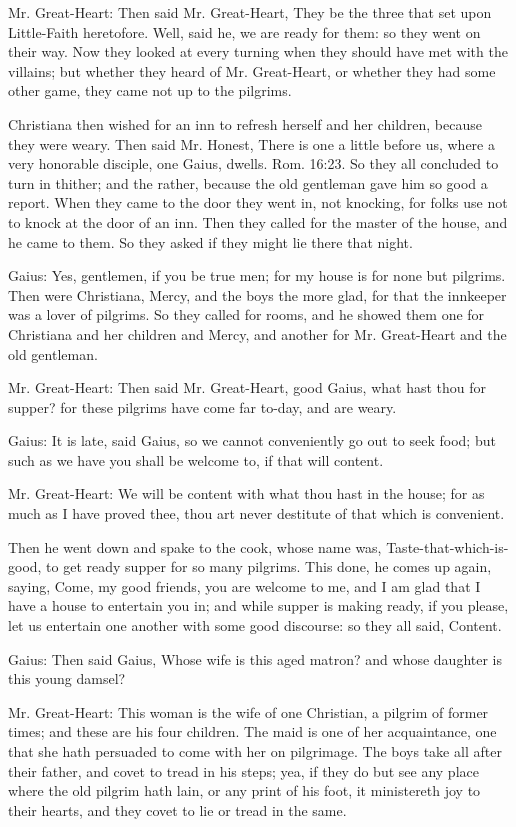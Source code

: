 Mr. Great-Heart: Then said Mr. Great-Heart, They be the three that set upon Little-Faith heretofore. Well, said he, we are ready for them: so they went on their way. Now they looked at every turning when they should have met with the villains; but whether they heard of Mr. Great-Heart, or whether they had some other game, they came not up to the pilgrims.

Christiana then wished for an inn to refresh herself and her children, because they were weary. Then said Mr. Honest, There is one a little before us, where a very honorable disciple, one Gaius, dwells. Rom. 16:23. So they all concluded to turn in thither; and the rather, because the old gentleman gave him so good a report. When they came to the door they went in, not knocking, for folks use not to knock at the door of an inn. Then they called for the master of the house, and he came to them. So they asked if they might lie there that night.

Gaius: Yes, gentlemen, if you be true men; for my house is for none but pilgrims. Then were Christiana, Mercy, and the boys the more glad, for that the innkeeper was a lover of pilgrims. So they called for rooms, and he showed them one for Christiana and her children and Mercy, and another for Mr. Great-Heart and the old gentleman.

Mr. Great-Heart: Then said Mr. Great-Heart, good Gaius, what hast thou for supper? for these pilgrims have come far to-day, and are weary.

Gaius: It is late, said Gaius, so we cannot conveniently go out to seek food; but such as we have you shall be welcome to, if that will content.

Mr. Great-Heart: We will be content with what thou hast in the house; for as much as I have proved thee, thou art never destitute of that which is convenient.

Then he went down and spake to the cook, whose name was, Taste-that-which-is-good, to get ready supper for so many pilgrims. This done, he comes up again, saying, Come, my good friends, you are welcome to me, and I am glad that I have a house to entertain you in; and while supper is making ready, if you please, let us entertain one another with some good discourse: so they all said, Content.

Gaius: Then said Gaius, Whose wife is this aged matron? and whose daughter is this young damsel?

Mr. Great-Heart: This woman is the wife of one Christian, a pilgrim of former times; and these are his four children. The maid is one of her acquaintance, one that she hath persuaded to come with her on pilgrimage. The boys take all after their father, and covet to tread in his steps; yea, if they do but see any place where the old pilgrim hath lain, or any print of his foot, it ministereth joy to their hearts, and they covet to lie or tread in the same.

